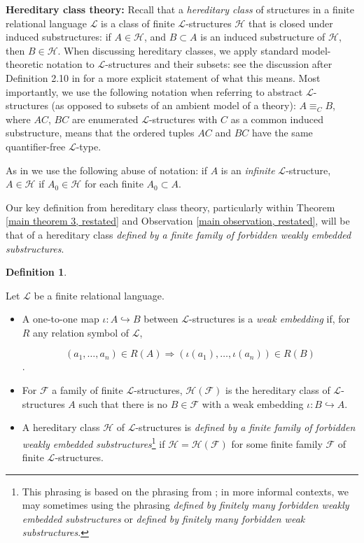 \documentclass{amsart}
\theoremstyle{definition}
\newtheorem{definition}[theorem]{Definition}
\theoremstyle{remark}
\numberwithin{equation}{section}
\begin{document}
\textbf{Hereditary class theory:} Recall that a \textit{hereditary class} of structures in a finite relational language $\mathcal{L}$ is a class of finite $\mathcal{L}$-structures $\mathcal{H}$ that is closed under induced substructures: if $A \in \mathcal{H}$, and $B \subset A$ is an induced substructure of $\mathcal{H}$, then $B \in \mathcal{H}$. When discussing hereditary classes, we apply standard model-theoretic notation to $\mathcal{L}$-structures and their subsets: see the discussion after Definition 2.10 in \cite{ApproxOrder} for a more explicit statement of what this means. Most importantly, we use the following notation when referring to abstract $\mathcal{L}$-structures (as opposed to subsets of an ambient model of a theory): $A \equiv_{C} B$, where $AC$, $BC$ are enumerated $\mathcal{L}$-structures with $C$ as a common induced substructure, means that the ordered tuples $AC$ and $BC$ have the same quantifier-free $\mathcal{L}$-type.

As in \cite{ApproxOrder} we use the following abuse of notation: if $A$ is an \textit{infinite} $\mathcal{L}$-structure, $A \in \mathcal{H}$ if $A_{0} \in \mathcal{H}$ for each finite $A_{0} \subset A$.

Our key definition from hereditary class theory, particularly within Theorem \ref{main theorem 3, restated} and Observation \ref{main observation, restated}, will be that of a hereditary class \textit{defined by a finite family of forbidden weakly embedded substructures}.

\begin{definition}\label{defined by finitely many forbidden weakly embedded substructures}

   Let $\mathcal{L}$ be a finite relational language.

\begin{itemize}
    \item A one-to-one map $\iota: A \hookrightarrow B$ between $\mathcal{L}$-structures is a \emph{weak embedding} if, for $R$ any relation symbol of $\mathcal{L}$,

    $$(a_{1}, \ldots, a_{n}) \in R(A) \Rightarrow (\iota(a_{1}), \ldots, \iota(a_{n})) \in R(B)$$.

    \item For $\mathcal{F}$ a family of finite $\mathcal{L}$-structures, $\mathcal{H}(\mathcal{F})$ is the hereditary class of $\mathcal{L}$-structures $A$ such that there is no $B \in \mathcal{F}$ with a weak embedding $\iota: B \hookrightarrow A$.

    \item A hereditary class $\mathcal{H}$ of $\mathcal{L}$-structures is \textit{defined by a finite family of forbidden weakly embedded substructures}\footnote{This phrasing is based on the phrasing from \cite{ApproxOrder}; in more informal contexts, we may sometimes using the phrasing \textit{defined by finitely many forbidden weakly embedded substructures} or \textit{defined by finitely many forbidden weak substructures}.} if $\mathcal{H} = \mathcal{H}(\mathcal{F})$ for some finite family $\mathcal{F}$ of finite $\mathcal{L}$-structures.
\end{itemize}
    
\end{definition}
\end{document}
